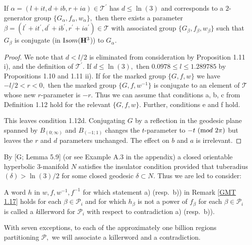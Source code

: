 \begin{lemma}\label{GMT 1.13}
If $\alpha=(l+it, d+ib, r+ia)\in {\mathcal T}^{\prime}$ has $d\le \ln(3)$ and
corresponds to a $2$\/{\textrm -}\/generator group
$\{G_\alpha,f_\alpha,w_\alpha\},$ then there exists a parameter $\beta=(l^{\prime}+it^{\prime}, d^{\prime}+ib^{\prime}, r^{\prime}+ia^{\prime})\in {\mathcal T}$ 
with associated group $\{G_\beta,f_\beta, w_\beta\}$ such that $G_\beta$ is conjugate (in ${\textrm Isom}({\mathbf H}^3$)) to $G_\alpha.$ 
\end{lemma}

\begin{proof} We note that $d < l/2$ is eliminated from consideration by Proposition 1.11 i), and the definition of ${\mathcal T}^\prime.$ If $d\le \ln(3),$
then
$0.0978\le l\le 1.289785$ by Propositions 1.10 and 1.11 ii).  If for the marked group $\{G, f, w\}$ we have 
$-l/2<r<0,$ then the marked group
$\{G,f,w^{-1}\}$ is conjugate to an element of ${\mathcal T}$ whose new
$r$-parameter is $-r.$  Thus we can assume that
conditions a, b, c from Definition 1.12 hold for the relevant $\{G,f,w\}.$  Further,    conditions e and f hold.

This leaves condition 1.12d.  Conjugating $G$ by a
reflection in the geodesic plane spanned
by $B_{(0;\infty)}$ and $B_{(-1;1)}$ changes the $t$-parameter to 
$-t \ ({\textrm mod}\ 2\pi)$
but leaves the $r$ and $d$ parameters unchanged.
The effect on $b$ and $a$ is irrelevant.  \end{proof}

By [G; Lemma 5.9] (or see Example A.3 in the appendix) a closed orientable hyperbolic $3$-manifold $N$
satisfies the insulator condition provided that
tuberadius$(\delta) > \ln(3)/2$ for some closed geodesic $\delta\subset N.$  Thus we
are led to consider:

\begin{definition}  A word $h$ in $w,f,w^{-1},f^{-1}$ for which statement a) (resp.\ b)) in Remark \ref{GMT 1.17} holds for each $\beta\in {\mathcal P}_i$
and for which $h_\beta$ is not a power of $f_\beta$ for each $\beta\in {\mathcal P}_i$ is
called a {\textit killerword} for ${\mathcal P}_i$ with respect to contradiction a) (resp.\ b)).
\end{definition}

\begin{summary}  With seven exceptions,  to each of the approximately one
billion regions partitioning ${\mathcal P},$ we will
associate a killerword and a contradiction.  \end{summary} 

